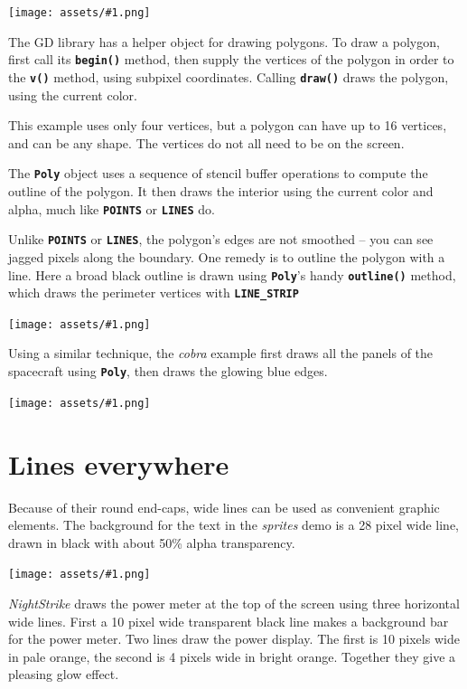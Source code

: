 \documentclass[10pt]{book}
\newcommand{\png}[1]{
\begin{center}
\texttt{[image: assets/\#1.png]}
\end{center}
}
\newcommand{\mach}[1]{\texttt{\textbf{#1}}}
\begin{document}
\begin{CJK}{UTF8}{gkai}
\png{0050}

The GD library has a helper object for drawing polygons.
To draw a polygon, first call its
\mach{begin()} method, then supply the vertices of the polygon in order
to the \mach{v()} method, using subpixel coordinates.
Calling \mach{draw()} draws the polygon, using the current color.

This example uses only four vertices, but
a polygon can have up to 16 vertices, and can be any shape.
The vertices do not all need to be on the screen.

The \mach{Poly} object uses a sequence of stencil buffer operations to
compute the outline of the polygon.
It then draws the interior using
the current color and alpha, much like \mach{POINTS} or \mach{LINES} do.


\newpage
Unlike \mach{POINTS} or \mach{LINES}, the polygon's edges are not smoothed --
you can see jagged pixels along the boundary.
One remedy is to outline the polygon with a line.
Here a broad black outline is drawn using
\mach{Poly}'s handy
\mach{outline()} method, which draws the perimeter vertices with
\mach{LINE\_STRIP}


\png{0051}

Using a similar technique, the \textit{cobra} example
first draws all the panels of the spacecraft using
\mach{Poly},
then draws the glowing blue edges.
\png{cobra}

\newpage
\section{Lines everywhere}

Because of their round end-caps, wide lines can be used as convenient graphic elements.
The background for the text in the \textit{sprites} demo is a 28 pixel wide line,
drawn in black with about 50\% alpha transparency.
\png{lines-el}

\textit{NightStrike} draws the power meter at the top of the screen
using three horizontal wide lines.
First a 10 pixel wide transparent black line makes a background bar for the power meter.
Two lines draw the power display.
The first is 10 pixels wide in pale orange, the second is 4 pixels wide in bright orange.
Together they give a pleasing glow effect.


\end{CJK}
\end{document}

